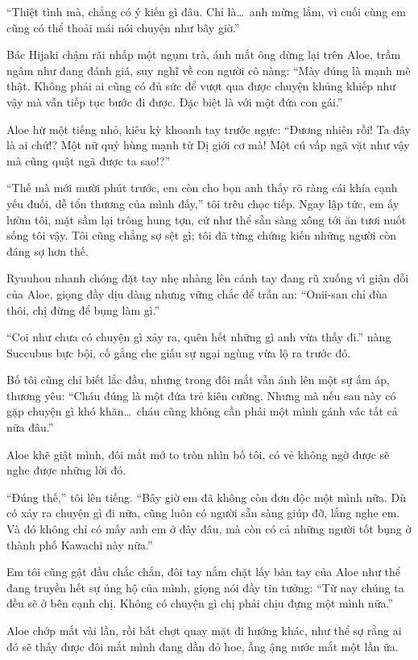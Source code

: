 \documentclass[../main.tex]{subfiles}
\begin{document}
``Thiệt tình mà, chẳng có ý kiến gì đâu. Chỉ là\dots\ anh mừng lắm, vì cuối cùng em cũng có thể thoải mái nói chuyện như bây giờ.''

Bác Hijaki chậm rãi nhấp một ngụm trà, ánh mắt ông dừng lại trên Aloe, trầm ngâm như đang đánh giá, suy nghĩ về con người cô nàng: ``Mày đúng là mạnh mẽ thật. Không phải ai cũng có đủ sức để vượt qua được chuyện khủng khiếp như vậy mà vẫn tiếp tục bước đi được. Đặc biệt là với một đứa con gái.''

Aloe hừ một tiếng nhỏ, kiêu kỳ khoanh tay trước ngực: ``Đương nhiên rồi! Ta đây là ai chứ!? Một nữ quỷ hùng mạnh từ Dị giới cơ mà! Một cú vấp ngã vặt như vậy mà cũng quật ngã được ta sao!?''

``Thế mà mới mười phút trước, em còn cho bọn anh thấy rõ ràng cái khía cạnh yếu đuối, dễ tổn thương của mình đấy,'' tôi trêu chọc tiếp. Ngay lập tức, em ấy lườm tôi, mặt sầm lại trông hung tợn, cứ như thể sẵn sàng xông tới ăn tươi nuốt sống tôi vậy. Tôi cũng chẳng sợ sệt gì; tôi đã từng chứng kiến những người còn đáng sợ hơn thế.

Ryuuhou nhanh chóng đặt tay nhẹ nhàng lên cánh tay đang rũ xuống vì giận dỗi của Aloe, giọng đầy dịu dàng nhưng vững chắc để trấn an: ``Onii-san chỉ đùa thôi, chị đừng để bụng làm gì.''

``Coi như chưa có chuyện gì xảy ra, quên hết những gì anh vừa thấy đi.'' nàng Succubus bực bội, cố gắng che giấu sự ngại ngùng vừa lộ ra trước đó.

Bố tôi cũng chỉ biết lắc đầu, nhưng trong đôi mắt vẫn ánh lên một sự ấm áp, thương yêu: ``Cháu đúng là một đứa trẻ kiên cường. Nhưng mà nếu sau này có gặp chuyện gì khó khăn\dots\ cháu cũng không cần phải một mình gánh vác tất cả nữa đâu.''

Aloe khẽ giật mình, đôi mắt mở to tròn nhìn bố tôi, có vẻ không ngờ được sẽ nghe được những lời đó.

``Đúng thế,'' tôi lên tiếng. ``Bây giờ em đã không còn đơn độc một mình nữa. Dù có xảy ra chuyện gì đi nữa, cũng luôn có người sẵn sàng giúp đỡ, lắng nghe em. Và đó không chỉ có mấy anh em ở đây đâu, mà còn có cả những người tốt bụng ở thành phố Kawachi này nữa.''

Em tôi cũng gật đầu chắc chắn, đôi tay nắm chặt lấy bàn tay của Aloe như thể đang truyền hết sự ủng hộ của mình, giọng nói đầy tin tưởng: ``Từ nay chúng ta đều sẽ ở bên cạnh chị. Không có chuyện gì chị phải chịu đựng một mình nữa.''

Aloe chớp mắt vài lần, rồi bất chợt quay mặt đi hướng khác, như thể sợ rằng ai đó sẽ thấy được đôi mắt mình đang dần đỏ hoe, ầng ậng nước mắt một lần ữa.
\end{document}
